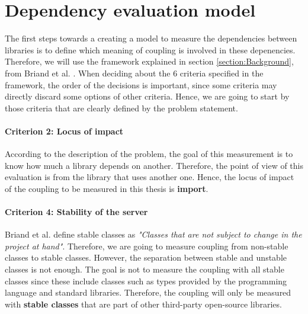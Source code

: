 \documentclass[a4paper]{article}
\begin{document}

\section{Dependency evaluation model}
The first steps towards a creating a model to measure the dependencies between libraries is to define which meaning of coupling is involved in these depenencies. Therefore, we will use the framework explained in section \ref{section:Background}, from Briand et al. \cite{briand1999unified}. When deciding about the 6 criteria specified in the framework, the order of the decisions is important, since some criteria may directly discard some options of other criteria. Hence, we are going to start by those criteria that are clearly defined by the problem statement.

\paragraph{Criterion 2: Locus of impact}
According to the description of the problem, the goal of this measurement is to know how much a library depends on another. Therefore, the point of view of this evaluation is from the library that uses another one. Hence, the locus of impact of the coupling to be measured in this thesis is \textbf{import}.

\paragraph{Criterion 4: Stability of the server}
Briand et al. \cite{briand1999unified} define stable classes as \textit{"Classes that are not subject to change in the project at hand"}. Therefore, we are going to measure coupling from non-stable classes to stable classes.
However, the separation between stable and unstable classes is not enough. The goal is not to measure the coupling with all stable classes since these include classes such as types provided by the programming language and standard libraries. Therefore, the coupling will only be measured with \textbf{stable classes} that are part of other third-party open-source libraries.
\end{document}
